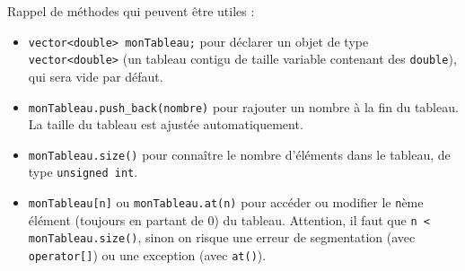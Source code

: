 \documentclass{book}
\newcommand{\inline}[1]{\texttt{#1}}
\begin{document}
Rappel de méthodes qui peuvent être utiles :
\begin{itemize}
 \item \inline{vector<double> monTableau;} pour déclarer un objet de type \inline{vector<double>} (un tableau contigu de taille variable contenant des \inline{double}), qui sera vide par défaut.
 \item \inline{monTableau.push_back(nombre)} pour rajouter un nombre à la fin du tableau. La taille du tableau est ajustée automatiquement.
 \item \inline{monTableau.size()} pour connaître le nombre d'éléments dans le tableau, de type \inline{unsigned int}.
 \item \inline{monTableau[n]} ou \inline{monTableau.at(n)} pour accéder ou modifier le \texttt{n}ème élément (toujours en partant de 0) du tableau. Attention, il faut que \inline{n < monTableau.size()}, sinon on risque une erreur de segmentation (avec \inline{operator[]}) ou une exception (avec \inline{at()}).
\end{itemize}
\end{document}
